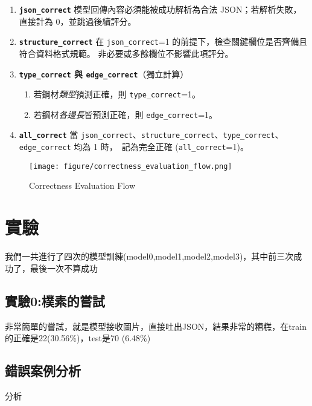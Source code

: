 \documentclass[UTF8, fontset=none]{ctexart}
\begin{document}
\begin{enumerate}[label=\textbf{\arabic*.}]
  \item \textbf{\texttt{json\_correct}}  
        模型回傳內容必須能被成功解析為合法 \textsc{JSON}；若解析失敗，直接計為 0，並跳過後續評分。
        
  \item \textbf{\texttt{structure\_correct}}  
        在 \texttt{json\_correct}=1 的前提下，檢查關鍵欄位是否齊備且符合資料格式規範。  
        非必要或多餘欄位不影響此項評分。
        
  \item \textbf{\texttt{type\_correct} 與 \texttt{edge\_correct}}（獨立計算）  
        \begin{enumerate}[leftmargin=*, label*=\arabic*.]
            \item 若鋼材\emph{類型}預測正確，則 \texttt{type\_correct}=1。  
            \item 若鋼材\emph{各邊長}皆預測正確，則 \texttt{edge\_correct}=1。
        \end{enumerate}

  \item \textbf{\texttt{all\_correct}}  
        當 \texttt{json\_correct}、\texttt{structure\_correct}、\texttt{type\_correct}、\texttt{edge\_correct} 均為 1 時，\
        記為完全正確 (\texttt{all\_correct}=1)。
\end{enumerate}
\begin{figure}[H]
    \centering
    \texttt{[image: figure/correctness\_evaluation\_flow.png]}
    \caption{Correctness Evaluation Flow}
    \label{fig:correctness-flow}
\end{figure}

\section{實驗}
我們一共進行了四次的模型訓練(model0,model1,model2,model3)，其中前三次成功了，最後一次不算成功

\subsection{實驗0:樸素的嘗試}
非常簡單的嘗試，就是模型接收圖片，直接吐出JSON，結果非常的糟糕，在train的正確是22(30.56\%)，test是70 (6.48\%)

\subsection*{錯誤案例分析}
分析
\end{document}
